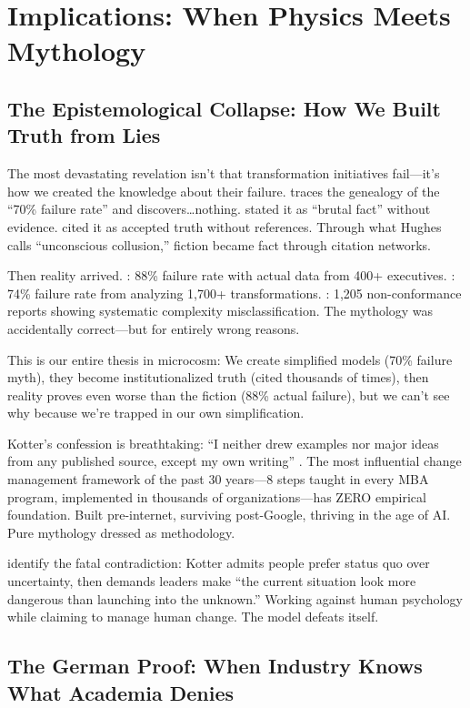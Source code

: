 \section{Implications: When Physics Meets Mythology}

\subsection{The Epistemological Collapse: How We Built Truth from Lies}

The most devastating revelation isn't that transformation initiatives fail---it's how we created the knowledge about their failure. \citet{hughes2011} traces the genealogy of the ``70\% failure rate'' and discovers\ldots nothing. \citet{beer2000} stated it as ``brutal fact'' without evidence. \citet{kotter2008} cited it as accepted truth without references. Through what Hughes calls ``unconscious collusion,'' fiction became fact through citation networks.

Then reality arrived. \citet{bain2024}: 88\% failure rate with actual data from 400+ executives. \citet{bcg2024}: 74\% failure rate from analyzing 1,700+ transformations. \citet{ford2024}: 1,205 non-conformance reports showing systematic complexity misclassification. The mythology was accidentally correct---but for entirely wrong reasons.

This is our entire thesis in microcosm: We create simplified models (70\% failure myth), they become institutionalized truth (cited thousands of times), then reality proves even worse than the fiction (88\% actual failure), but we can't see why because we're trapped in our own simplification.

Kotter's confession is breathtaking: ``I neither drew examples nor major ideas from any published source, except my own writing'' \citep{hughes2015}. The most influential change management framework of the past 30 years---8 steps taught in every MBA program, implemented in thousands of organizations---has ZERO empirical foundation. Built pre-internet, surviving post-Google, thriving in the age of AI. Pure mythology dressed as methodology.

\citet{mclaren2023} identify the fatal contradiction: Kotter admits people prefer status quo over uncertainty, then demands leaders make ``the current situation look more dangerous than launching into the unknown.'' Working against human psychology while claiming to manage human change. The model defeats itself.

\subsection{The German Proof: When Industry Knows What Academia Denies}

